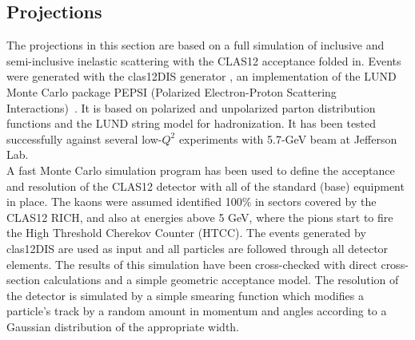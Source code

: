 \subsection{Projections}
%
The projections in this section are based on a full simulation of inclusive and semi-inclusive inelastic scattering with the CLAS12 acceptance folded in. Events were generated with the clas12DIS generator \cite{CLAS12DIS}, an implementation of the LUND Monte Carlo package PEPSI (Polarized Electron-Proton Scattering Interactions)~\cite{Mankiewicz:1991dp}. 
It is based on polarized and unpolarized parton distribution functions and the LUND string model for hadronization.
It has been tested successfully against several low-$Q^2$ experiments with 5.7-GeV beam at Jefferson Lab.\\

A fast Monte Carlo simulation program  has been used to define the acceptance and resolution of the CLAS12 detector with all of the standard (base) equipment
in place. The kaons were assumed identified 100\% in sectors covered by the CLAS12 RICH, and also at energies above 5 GeV, where the pions start to fire the High Threshold Cherekov Counter (HTCC).
The events generated by clas12DIS are used as input and all particles are followed through all detector elements. 
The results of this simulation have been cross-checked with direct cross-section calculations and a simple geometric acceptance model. The resolution of the detector is simulated by a simple smearing function which modifies a particle's track by a random amount in momentum and angles according to a Gaussian distribution of the appropriate width.

%
